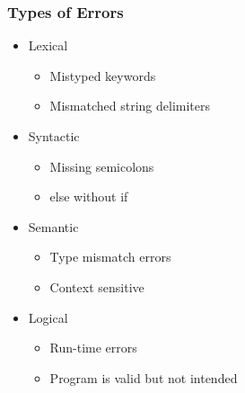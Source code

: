 \documentclass[usepdftitle=false,professionalfonts,compress ]{beamer}
\begin{document}
{
\begin{frame}\frametitle{Types of Errors}

	\begin{itemize}
	\item Lexical

	\begin{itemize}
	\item Mistyped keywords
			\item Mismatched string delimiters
				\end{itemize}

			\item Syntactic

	\begin{itemize}
	\item Missing semicolons
			\item else without if
				\end{itemize}

			\item Semantic

	\begin{itemize}
	\item Type mismatch errors
			\item Context sensitive
				\end{itemize}

			\item Logical

	\begin{itemize}
	\item Run-time errors
			\item Program is valid but not intended
				\end{itemize}

				\end{itemize}

\end{frame}}
\end{document}
